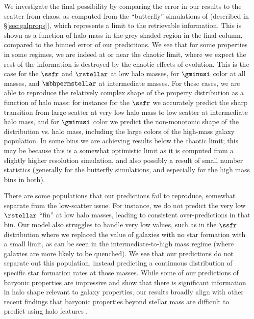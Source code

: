 We investigate the final possibility by comparing the error in our results to the scatter from chaos, as computed from the ``butterfly'' simulations of \cite{Genel2019} (described in \S\ref{sec:galprops}), which represents a limit to the retrievable information.
This is shown as a function of halo mass in the grey shaded region in the final column, compared to the binned error of our predictions.
We see that for some properties in some regimes, we are indeed at or near the chaotic limit, where we expect the rest of the information is destroyed by the chaotic effects of evolution.
This is the case for the $\ssfr$ and $\rstellar$ at low halo masses, for $\gminusi$ color at all masses, and $\mbhpermstellar$ at intermediate masses.
For these cases, we are able to reproduce the relatively complex shape of the property distribution as a function of halo mass: for instance for the $\ssfr$ we accurately predict the sharp transition from large scatter at very low halo mass to low scatter at intermediate halo mass, and for $\gminusi$ color we predict the non-monotonic shape of the distribution vs. halo mass, including the large colors of the high-mass galaxy population.
In some bins we are achieving results below the chaotic limit; this may be because this is a somewhat optimistic limit as it is computed from a slightly higher resolution simulation, and also possibly a result of small number statistics (generally for the butterfly simulations, and especially for the high mass bins in both).

There are some populations that our predictions fail to reproduce, somewhat separate from the low-scatter issue.
For instance, we do not predict the very low $\rstellar$ ``fin'' at low halo masses, leading to consistent over-predictions in that bin.
Our model also struggles to handle very low values, such as in the $\ssfr$ distribution where we replaced the value of galaxies with no star formation with a small limit, as can be seen in the intermediate-to-high mass regime (where galaxies are more likely to be quenched).
We see that our predictions do not separate out this population, instead predicting a continuous distribution of specific star formation rates at those masses.
While some of our predictions of baryonic properties are impressive and show that there is significant information in halo shape relevant to galaxy properties, our results broadly align with other recent findings that baryonic properties beyond stellar mass are difficult to predict using halo features \citep{de_santi_mimicking_2021,stiskalek_scatter_2022}.

